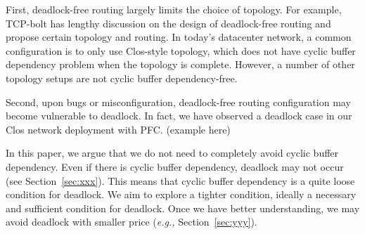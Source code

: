 First, deadlock-free routing largely limits the choice of topology. For example, TCP-bolt 
has lengthy discussion on the design of deadlock-free routing and propose certain topology and routing. 
In today's datacenter network, a common configuration is to only use Clos-style topology, which does 
not have cyclic buffer dependency problem when the topology is complete. However, a number
of other topology setups are not cyclic buffer dependency-free.

Second, upon bugs or misconfiguration, deadlock-free routing configuration may become
vulnerable to deadlock. In fact, we have observed a deadlock case in our Clos network
deployment with PFC. (example here)


In this paper, we argue that we do not need to completely avoid cyclic buffer dependency.
Even if there is cyclic buffer dependency, deadlock may not occur (see Section~\ref{sec:xxx}).
This means that cyclic buffer dependency is a quite loose condition for deadlock.
We aim to explore a tighter condition, ideally a necessary and sufficient condition for deadlock.
Once we have better understanding, we may avoid deadlock with smaller price ({\em e.g.,} Section~\ref{sec:yyy}).



